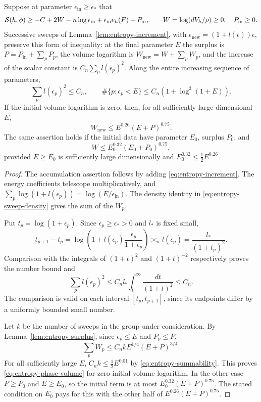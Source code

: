 \begin{lemma}\label{lem:entropy-accumulation}
Suppose at parameter \(\epsilon_{\mathrm{in}}\geq\epsilon_*\) that
\[
 \mathcal S(h,\phi)\geq-C+2W-n\log\epsilon_{\mathrm{in}}
                  +\epsilon_{\mathrm{in}}e_h(F)+P_{\mathrm{in}},
 \qquad W=\log(dV_h/\rho)\geq0,\quad P_{\mathrm{in}}\geq0.
\]
Successive sweeps of Lemma~\ref{lem:entropy-increment}, with
\(\epsilon_{\mathrm{new}}=(1+l(\epsilon))\epsilon\), preserve this
form of inequality: at the final parameter \(E\) the surplus is
\(P=P_{\mathrm{in}}+\sum_pP_p\), the volume logarithm is
\(W_{\mathrm{new}}=W+\sum_pW_p\), and the increase of the scalar
constant is \(C_n\sum_p l(\epsilon_p)^2\).  Along the entire increasing
sequence of parameters,
\begin{equation}\label{eq:entropy-summability}
 \sum_p l(\epsilon_p)^2\leq C_n,\qquad
 \#\{p:\epsilon_p<E\}\leq C_n(1+\log^3(1+E)).
\end{equation}
If the initial volume logarithm is zero, then, for all sufficiently
large dimensional \(E\),
\begin{equation}\label{eq:entropy-phase-volume}
 W_{\mathrm{new}}\leq E^{0.26}(E+P)^{0.75}.
\end{equation}
The same assertion holds if the initial data have parameter \(E_0\),
surplus \(P_0\), and
\[
 W\leq E_0^{0.32}(E_0+P_0)^{0.75},
\]
provided \(E\geq E_0\) is sufficiently large dimensionally and
\(E_0^{0.32}\leq\tfrac12E^{0.26}\).
\end{lemma}

\begin{proof}
The accumulation assertion follows by adding
\eqref{eq:entropy-increment}.  The energy coefficients telescope
multiplicatively, and
\(\sum_p\log(1+l(\epsilon_p))=\log(E/\epsilon_{\mathrm{in}})\).
The density identity in \eqref{eq:entropy-sweep-density} gives the
sum of the \(W_p\).

Put \(t_p=\log(1+\epsilon_p)\).  Since
\(\epsilon_p\geq\epsilon_*>0\) and \(l_*\) is fixed small,
\[
 t_{p+1}-t_p
 =\log\left(1+l(\epsilon_p)\frac{\epsilon_p}{1+\epsilon_p}\right)
 \asymp_n l(\epsilon_p)
 =\frac{l_*}{(1+t_p)^2}.
\]
Comparison with the integrals of \((1+t)^2\) and \((1+t)^{-2}\)
respectively proves the number bound and
\[
 \sum_p l(\epsilon_p)^2
 \leq C_n l_*\int_{t_0}^{\infty}\frac{dt}{(1+t)^2}\leq C_n.
\]
The comparison is valid on each interval \([t_p,t_{p+1}]\), since
its endpoints differ by a uniformly bounded small number.

Let \(k\) be the number of sweeps in the group under consideration.
By Lemma~\ref{lem:entropy-surplus}, since
\(\epsilon_p\leq E\) and \(P_p\leq P\),
\[
 \sum_pW_p\leq C_n k E^{1/4}(E+P)^{3/4}.
\]
For all sufficiently large \(E\),
\(C_n k\leq \tfrac12 E^{0.01}\) by
\eqref{eq:entropy-summability}.  This proves
\eqref{eq:entropy-phase-volume} for zero initial volume logarithm.
In the other case \(P\geq P_0\) and \(E\geq E_0\), so the initial
term is at most \(E_0^{0.32}(E+P)^{0.75}\).  The stated condition on
\(E_0\) pays for this with the other half of
\(E^{0.26}(E+P)^{0.75}\).
\end{proof}

